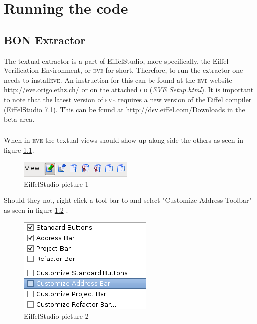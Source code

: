 \appendix
\chapter{Running the code}
\section{BON Extractor}
The textual \bon{} extractor is a part of EiffelStudio, more specifically, the Eiffel Verification Environment, or \textsc{eve} for short. Therefore, to run the extractor one needs to install\textsc{eve}. An instruction for this can be found at the \textsc{eve} website \url{http://eve.origo.ethz.ch/} or on the attached \textsc{cd} (\textit{EVE Setup.html}). It is important to note that the latest version of \textsc{eve} requires a new version of the Eiffel compiler (EiffelStudio 7.1). This can be found at \url{http://dev.eiffel.com/Downloads} in the beta area.

\paragraph{}
When in \textsc{eve} the textual \bon{} views should show up along side the others as seen in figure \ref{fig:EiffelStudio1}.

\begin{figure}[H]
\centering
\includegraphics[scale=0.8]{images/es1.png}
\caption{EiffelStudio picture 1}
\label{fig:EiffelStudio1}
\end{figure}

Should they not, right click a tool bar to and select "Customize Address Toolbar" as seen in figure \ref{fig:EiffelStudio2} .

\begin{figure}[H]
\centering
\includegraphics[scale=0.8]{images/es2.png}
\caption{EiffelStudio picture 2}
\label{fig:EiffelStudio2}
\end{figure}

